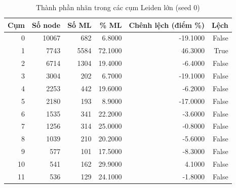 \begin{table}[htbp]
\caption{Thành phần nhãn trong các cụm Leiden lớn (seed 0)}
\label{tab:rq1_composition}
\begin{tabular}{rrrrrr}
\toprule
Cụm & Số node & Số ML & \% ML & Chênh lệch (điểm \%) & Lệch \\
\midrule
0 & 10067 & 682 & 6.8000 & -19.1000 & False \\
1 & 7743 & 5584 & 72.1000 & 46.3000 & True \\
2 & 6714 & 1304 & 19.4000 & -6.4000 & False \\
3 & 3004 & 202 & 6.7000 & -19.1000 & False \\
4 & 2253 & 442 & 19.6000 & -6.2000 & False \\
5 & 2180 & 193 & 8.9000 & -17.0000 & False \\
6 & 1535 & 341 & 22.2000 & -3.6000 & False \\
7 & 1256 & 314 & 25.0000 & -0.8000 & False \\
8 & 1039 & 210 & 20.2000 & -5.6000 & False \\
9 & 577 & 101 & 17.5000 & -8.3000 & False \\
10 & 541 & 162 & 29.9000 & 4.1000 & False \\
11 & 536 & 129 & 24.1000 & -1.8000 & False \\
\bottomrule
\end{tabular}
\end{table}
